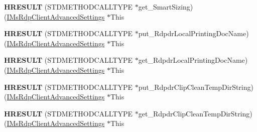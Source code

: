 \begin{DoxyCompactItemize}
\mbox{\label{struct_m_s_t_s_c_lib_1_1_i_ms_rdp_client_advanced_settings_vtbl_a1ab9f50990a976d3fd4708fc62ee6caf}} 
{\bfseries H\+R\+E\+S\+U\+LT} (S\+T\+D\+M\+E\+T\+H\+O\+D\+C\+A\+L\+L\+T\+Y\+PE $\ast$get\+\_\+\+Smart\+Sizing)(\hyperlink{interface_m_s_t_s_c_lib_1_1_i_ms_rdp_client_advanced_settings}{I\+Ms\+Rdp\+Client\+Advanced\+Settings} $\ast$This
\item 
\mbox{\label{struct_m_s_t_s_c_lib_1_1_i_ms_rdp_client_advanced_settings_vtbl_af996962c26f468f91d05c3d408606beb}} 
{\bfseries H\+R\+E\+S\+U\+LT} (S\+T\+D\+M\+E\+T\+H\+O\+D\+C\+A\+L\+L\+T\+Y\+PE $\ast$put\+\_\+\+Rdpdr\+Local\+Printing\+Doc\+Name)(\hyperlink{interface_m_s_t_s_c_lib_1_1_i_ms_rdp_client_advanced_settings}{I\+Ms\+Rdp\+Client\+Advanced\+Settings} $\ast$This
\item 
\mbox{\label{struct_m_s_t_s_c_lib_1_1_i_ms_rdp_client_advanced_settings_vtbl_a985e8f21932208ea7a81d4d6b463896d}} 
{\bfseries H\+R\+E\+S\+U\+LT} (S\+T\+D\+M\+E\+T\+H\+O\+D\+C\+A\+L\+L\+T\+Y\+PE $\ast$get\+\_\+\+Rdpdr\+Local\+Printing\+Doc\+Name)(\hyperlink{interface_m_s_t_s_c_lib_1_1_i_ms_rdp_client_advanced_settings}{I\+Ms\+Rdp\+Client\+Advanced\+Settings} $\ast$This
\item 
\mbox{\label{struct_m_s_t_s_c_lib_1_1_i_ms_rdp_client_advanced_settings_vtbl_ae82becb1684b9c3ee3c07691dbd389b3}} 
{\bfseries H\+R\+E\+S\+U\+LT} (S\+T\+D\+M\+E\+T\+H\+O\+D\+C\+A\+L\+L\+T\+Y\+PE $\ast$put\+\_\+\+Rdpdr\+Clip\+Clean\+Temp\+Dir\+String)(\hyperlink{interface_m_s_t_s_c_lib_1_1_i_ms_rdp_client_advanced_settings}{I\+Ms\+Rdp\+Client\+Advanced\+Settings} $\ast$This
\item 
\mbox{\label{struct_m_s_t_s_c_lib_1_1_i_ms_rdp_client_advanced_settings_vtbl_a069ee4f3e95488753076e57c0e9e2f77}} 
{\bfseries H\+R\+E\+S\+U\+LT} (S\+T\+D\+M\+E\+T\+H\+O\+D\+C\+A\+L\+L\+T\+Y\+PE $\ast$get\+\_\+\+Rdpdr\+Clip\+Clean\+Temp\+Dir\+String)(\hyperlink{interface_m_s_t_s_c_lib_1_1_i_ms_rdp_client_advanced_settings}{I\+Ms\+Rdp\+Client\+Advanced\+Settings} $\ast$This
\item 

\end{DoxyCompactItemize}
